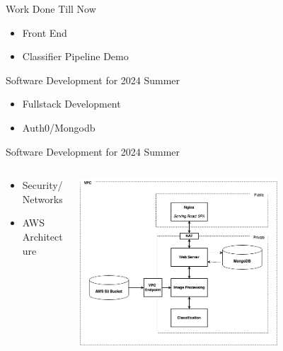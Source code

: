 

\begin{frame}{Work Done Till Now}
    \begin{itemize}
        \item Front End
        \item Classifier Pipeline Demo 
    \end{itemize}
\end{frame}


\begin{frame}{Software Development for 2024 Summer}
    \begin{itemize}
        \item Fullstack Development
        \item Auth0/Mongodb
    \end{itemize}
\end{frame}

\begin{frame}{Software Development for 2024 Summer}
        \begin{columns}
        \begin{column}{0.5\textwidth}
            \begin{itemize}
                \item Security/Networks
                \item AWS Architecture
            \end{itemize}
        \end{column}
        \begin{column}{0.5\textwidth}
            \includegraphics[height=0.7\textheight,width=0.7\textwidth,keepaspectratio]{images/mm_system.png}
        \end{column}
    \end{columns}
\end{frame}

